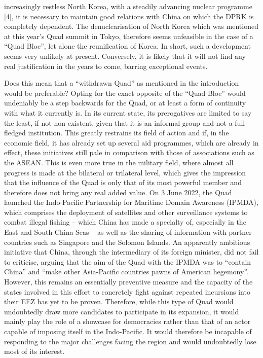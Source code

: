 \documentclass[11pt,a4paper]{article}
\begin{document}
increasingly restless North Korea, with a steadily advancing nuclear programme {[}4{]}, it is necessary to maintain good relations with China on which the DPRK is completely dependent. The denuclearisation of North Korea which was mentioned at this year’s Quad summit in Tokyo, therefore seems unfeasible in the case of a “Quad Bloc”, let alone the reunification of Korea. In short, such a development seems very unlikely at present. Conversely, it is likely that it will not find any real justification in the years to come, barring exceptional events.

Does this mean that a “withdrawn Quad” as mentioned in the introduction would be preferable? Opting for the exact opposite of the “Quad Bloc” would undeniably be a step backwards for the Quad, or at least a form of continuity with what it currently is. In its current state, its prerogatives are limited to say the least, if not non-existent, given that it is an informal group and not a full-fledged institution. This greatly restrains its field of action and if, in the economic field, it has already set up several aid programmes, which are already in effect, these initiatives still pale in comparison with those of associations such as the ASEAN. This is even more true in the military field, where almost all progress is made at the bilateral or trilateral level, which gives the impression that the influence of the Quad is only that of its most powerful member and therefore does not bring any real added value. On 3 June 2022, the Quad launched the Indo-Pacific Partnership for Maritime Domain Awareness (IPMDA), which comprises the deployment of satellites and other surveillance systems to combat illegal fishing – which China has made a specialty of, especially in the East and South China Seas – as well as the sharing of information with partner countries such as Singapore and the Solomon Islands. An apparently ambitious initiative that China, through the intermediary of its foreign minister, did not fail to criticise, arguing that the aim of the Quad with the IPMDA was to “contain China” and “make other Asia-Pacific countries pawns of American hegemony”. However, this remains an essentially preventive measure and the capacity of the states involved in this effort to concretely fight against repeated incursions into their EEZ has yet to be proven. Therefore, while this type of Quad would undoubtedly draw more candidates to participate in its expansion, it would mainly play the role of a showcase for democracies rather than that of an actor capable of imposing itself in the Indo-Pacific. It would therefore be incapable of responding to the major challenges facing the region and would undoubtedly lose most of its interest.
\end{document}
